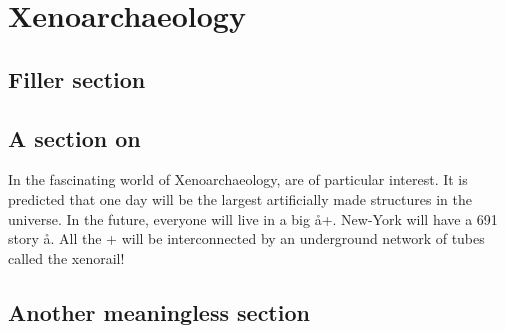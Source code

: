\documentclass[a4paper,12pt,twoside,openright]{memoir}
\begin{document}
\glsunsetall
\tableofcontents

\glsresetall


\chapter{Xenoarchaeology}

\section{Filler section}
\kant*[1-2]

\section{A section on \AAs{}} %
In the fascinating world of Xenoarchaeology, \AAs are of particular interest.
It is predicted that one day \AAs will be the largest artificially made 
structures in the universe. In the future, everyone will live in a big \aa+. 
New-York will have a 691 story \aa. All the \aas+ will be interconnected by an
underground network of tubes called the xenorail!


\section{Another meaningless section}
\kant*[3-4]

\printglossary
\end{document}
